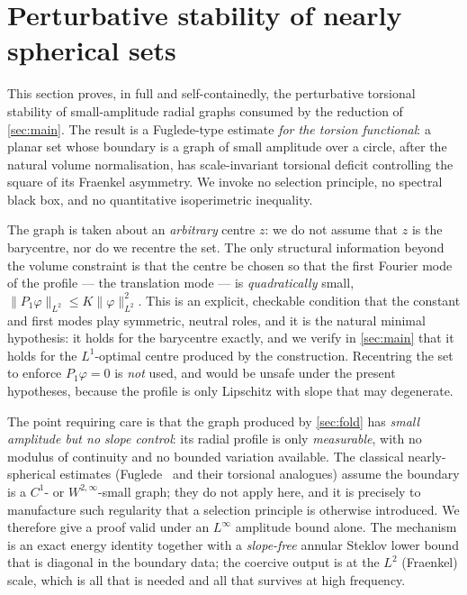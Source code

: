 \section{Perturbative stability of nearly spherical sets}
\label{sec:nearly}

This section proves, in full and self-containedly, the perturbative
torsional stability of small-amplitude radial graphs consumed by the
reduction of \cref{sec:main}. The result is a Fuglede-type estimate
\emph{for the torsion functional}: a planar set whose boundary is a graph of
small amplitude over a circle, after the natural volume normalisation, has
scale-invariant torsional deficit controlling the square of its Fraenkel
asymmetry. We invoke no selection principle, no spectral black box, and no
quantitative isoperimetric inequality.

The graph is taken about an \emph{arbitrary} centre $z$: we do not assume
that $z$ is the barycentre, nor do we recentre the set. The only structural
information beyond the volume constraint is that the centre be chosen so that
the first Fourier mode of the profile --- the translation mode --- is
\emph{quadratically} small, $\|P_1\varphi\|_{L^2}\le K\|\varphi\|_{L^2}^2$.
This is an explicit, checkable condition that the constant and first modes
play symmetric, neutral roles, and it is the natural minimal hypothesis: it
holds for the barycentre exactly, and we verify in \cref{sec:main} that it
holds for the $L^1$-optimal centre produced by the construction. Recentring
the set to enforce $P_1\varphi=0$ is \emph{not} used, and would be unsafe
under the present hypotheses, because the profile is only Lipschitz with
slope that may degenerate.

The point requiring care is that the graph produced by \cref{sec:fold} has
\emph{small amplitude but no slope control}: its radial profile is only
\emph{measurable}, with no modulus of continuity and no bounded variation
available. The
classical nearly-spherical estimates (Fuglede~\cite{Fuglede1989} and their
torsional analogues) assume the boundary is a $C^1$- or $W^{2,\infty}$-small
graph; they do not apply here, and it is precisely to manufacture such
regularity that a selection principle is otherwise introduced. We therefore
give a proof valid under an $L^\infty$ amplitude bound alone. The mechanism
is an exact energy identity together with a \emph{slope-free} annular
Steklov lower bound that is diagonal in the boundary data; the coercive
output is at the $L^2$ (Fraenkel) scale, which is all that is needed and all
that survives at high frequency.

